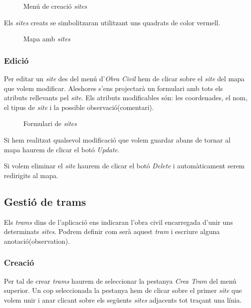 \documentclass[a4paper]{article}
\begin{document}
	\begin{figure}[H]
		\centering
		\caption{Menú de creació \emph{sites}}
	\end{figure}

	Els \emph{sites} creats se simbolitzaran utilitzant uns quadrats de color vermell.
	
	\begin{figure}[H]
		\centering
		\caption{Mapa amb \emph{sites}}
	\end{figure}

	\subsubsection{Edició}
	Per editar un \emph{site} des del menú d'\emph{Obra Civil} hem de clicar sobre el \emph{site} del mapa que volem modificar. Aleshores s'ens projectarà un formulari amb tots els atributs rellevants pel \emph{site}. Els atributs modificables són: les coordenades, el nom, el tipus de \emph{site} i la possible observació(comentari).
	
	\begin{figure}[H]
		\centering
		\caption{Formulari de \emph{sites}}
	\end{figure}

	Si hem realitzat qualsevol modificació que volem guardar abans de tornar al mapa haurem de clicar el botó \emph{Update}.
	
	Si volem eliminar el \emph{site} haurem de clicar el botó \emph{Delete} i automàticament serem redirigits al mapa.
	
	\subsection{Gestió de trams}
	Els \emph{trams} dins de l'aplicació ens indicaran l'obra civil encarregada d'unir uns determinats \emph{sites}. Podrem definir com serà aquest \emph{tram} i escriure alguna anotació(observation).
	
	\subsubsection{Creació}
	Per tal de crear \emph{trams} haurem de seleccionar la pestanya \emph{Crea Tram} del menú superior. Un cop seleccionada la pestanya hem de clicar sobre el primer \emph{site} que volem unir i anar clicant sobre els següents \emph{sites} adjacents tot traçant una línia.
	
\end{document}
